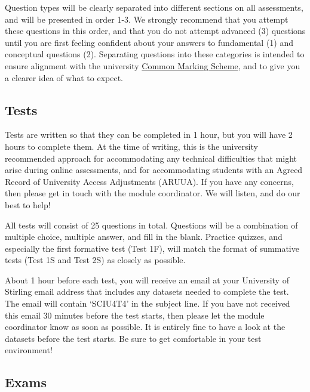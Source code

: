 \documentclass[
]{scrbook}
\begin{document}
\begin{enumerate}
\end{enumerate}

Question types will be clearly separated into different sections on all assessments, and will be presented in order 1-3.
We strongly recommend that you attempt these questions in this order, and that you do not attempt advanced (3) questions until you are first feeling confident about your answers to fundamental (1) and conceptual questions (2).
Separating questions into these categories is intended to ensure alignment with the university \href{https://www.stir.ac.uk/about/professional-services/student-academic-and-corporate-services/academic-registry/academic-policy-and-practice/quality-handbook/assessment-policy-and-procedure/appendix-1-undergraduate-common-marking-scheme/}{Common Marking Scheme}, and to give you a clearer idea of what to expect.

\hypertarget{tests}{%
\subsection*{Tests}\label{tests}}

Tests are written so that they can be completed in 1 hour, but you will have 2 hours to complete them.
At the time of writing, this is the university recommended approach for accommodating any technical difficulties that might arise during online assessments, and for accommodating students with an Agreed Record of University Access Adjustments (ARUUA).
If you have any concerns, then please get in touch with the module coordinator.
We will listen, and do our best to help!

All tests will consist of 25 questions in total.
Questions will be a combination of multiple choice, multiple answer, and fill in the blank.
Practice quizzes, and especially the first formative test (Test 1F), will match the format of summative tests (Test 1S and Test 2S) as closely as possible.

About 1 hour before each test, you will receive an email at your University of Stirling email address that includes any datasets needed to complete the test.
The email will contain `SCIU4T4' in the subject line.
If you have not received this email 30 minutes before the test starts, then please let the module coordinator know as soon as possible.
It is entirely fine to have a look at the datasets before the test starts.
Be sure to get comfortable in your test environment!

\hypertarget{exams}{%
\subsection*{Exams}\label{exams}}
\end{document}
